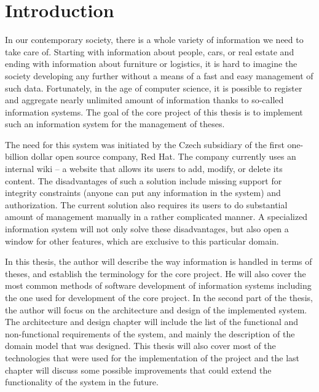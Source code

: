 \chapter{Introduction}

In our contemporary society, there is a whole variety of information we need to take care of. Starting with information about people, cars, or real estate and ending with information about furniture or logistics, it is hard to imagine the society developing any further without a means of a fast and easy management of such data. Fortunately, in the age of computer science, it is possible to register and aggregate nearly unlimited amount of information thanks to so-called information systems. The goal of the core project of this thesis is to implement such an information system for the management of theses.

The need for this system was initiated by the Czech subsidiary of the first one-billion dollar open source company\cite{redhat-revenue}, Red Hat. The company currently uses an internal wiki -- a website that allows its users to add, modify, or delete its content. The disadvantages of such a solution include missing support for integrity constraints (anyone can put any information in the system) and authorization. The current solution also requires its users to do substantial amount of management manually in a rather complicated manner. A specialized information system will not only solve these disadvantages, but also open a window for other features, which are exclusive to this particular domain.

In this thesis, the author will describe the way information is handled in terms of theses, and establish the terminology for the core project. He will also cover the most common methods of software development of information systems including the one used for development of the core project. In the second part of the thesis, the author will focus on the architecture and design of the implemented system. The architecture and design chapter will include the list of the functional and non-functional requirements of the system, and mainly the description of the domain model that was designed. This thesis will also cover most of the technologies that were used for the implementation of the project and the last chapter will discuss some possible improvements that could extend the functionality of the system in the future.
